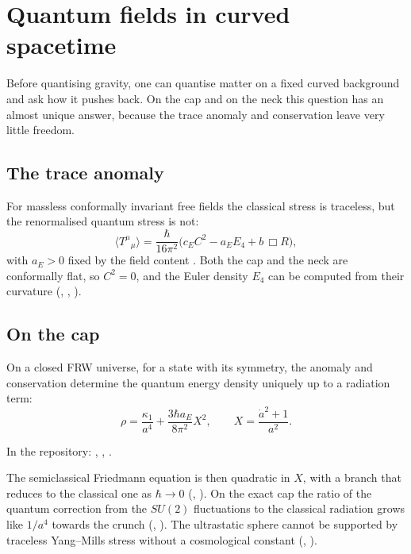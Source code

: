 \chapter{Quantum fields in curved spacetime}\label{ch:qft}

\begin{questionbox}
Before quantising gravity, one can quantise matter on a fixed curved background and ask how it pushes back. On the cap and on the neck this question has an almost unique answer, because the trace anomaly and conservation leave very little freedom.
\end{questionbox}

\section{The trace anomaly}

For massless conformally invariant free fields the classical stress is traceless, but the renormalised quantum stress is not:
\[
\langle T^\mu{}_\mu\rangle=\frac{\hbar}{16\pi^2}\bigl(c_EC^2-a_EE_4+b\,\Box R\bigr),
\]
with $a_E>0$ fixed by the field content \external. Both the cap and the neck are conformally flat, so $C^2=0$, and the Euler density $E_4$ can be computed from their curvature (, , ).

\section{On the cap}

\begin{theorem}\proved
On a closed FRW universe, for a state with its symmetry, the anomaly and conservation determine the quantum energy density uniquely up to a radiation term:
\[
\rho=\frac{\kappa_1}{a^4}+\frac{3\hbar a_E}{8\pi^2}X^2,\qquad X=\frac{\dot a^2+1}{a^2}.
\]
\end{theorem}
\noindent In the repository: , , .

The semiclassical Friedmann equation is then quadratic in $X$, with a branch that reduces to the classical one as $\hbar\to0$ (, ). On the exact cap the ratio of the quantum correction from the $SU(2)$ fluctuations to the classical radiation grows like $1/a^4$ towards the crunch (, ). The ultrastatic sphere cannot be supported by traceless Yang--Mills stress without a cosmological constant (, ).

